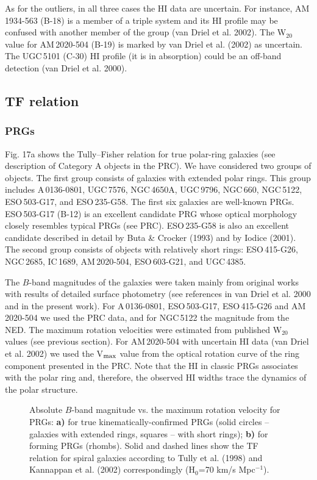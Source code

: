 \documentclass[]{aa}
\begin{document}
As for the outliers, in all three cases the HI data are uncertain.
For instance, AM\,1934-563 (B-18) is a member of a triple system
and its HI profile may be confused with another member of the group
(van Driel et al. 2002). The W$_{20}$ value for AM\,2020-504 (B-19) is marked
by van Driel et al. (2002) as uncertain. The UGC\,5101 (C-30) HI profile
(it is in absorption) could be an off-band detection (van Driel et al. 2000).

\subsection{TF relation}

\subsubsection{PRGs}

Fig. 17a shows the Tully--Fisher relation for true polar-ring
galaxies (see description of Category A objects in the PRC). 
We have considered two groups of objects. The first group
consists of galaxies with extended polar rings. This group includes
A\,0136-0801, UGC\,7576, NGC\,4650A, UGC\,9796,
NGC\,660, NGC\,5122, ESO\,503-G17, and ESO\,235-G58. The first six
galaxies are well-known PRGs. ESO\,503-G17 (B-12) is an excellent
candidate PRG whose optical morphology closely resembles
typical PRGs (see PRC). ESO\,235-G58 is also an excellent candidate 
described in detail by Buta \& Crocker (1993) and by Iodice (2001).
The second group consists of objects with relatively short rings:
ESO\,415-G26, NGC\,2685, IC\,1689, AM\,2020-504, ESO\,603-G21, and
UGC\,4385.

The $B$-band magnitudes of the galaxies were taken mainly from
original works with results of detailed surface photometry
(see references in van Driel et al. 2000 and in the present work). 
For A\,0136-0801,
ESO\,503-G17, ESO\,415-G26 and AM\,2020-504 we used the PRC data,
and for NGC\,5122 the magnitude from the NED. The maximum rotation velocities
were estimated from published W$_{20}$ values (see previous section).
For AM\,2020-504 with uncertain HI data (van Driel et al. 2002) 
we used the V$_{\rm max}$ value from the optical rotation curve of the ring
component presented in the PRC. Note that the HI in classic PRGs
associates with the polar ring and, therefore, the observed HI
widths trace the dynamics of the polar structure.

\begin{figure}
\centerline{}
\caption{Absolute $B$-band magnitude vs. the maximum rotation velocity
for PRGs: {\bf a)} for true kinematically-confirmed PRGs (solid 
circles -- galaxies with extended rings, squares -- with short rings);
{\bf b)}  for forming PRGs (rhombs). Solid and dashed lines show
the TF relation for spiral galaxies according to Tully et al. (1998)
and Kannappan et al. (2002) correspondingly (H$_0$=70 km/s Mpc$^{-1}$).}
\end{figure}
\end{document}
